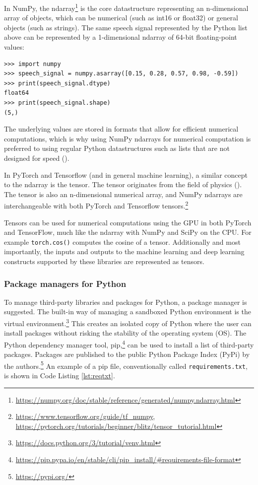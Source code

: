 \documentclass[report.tex]{subfiles}
\begin{document}
In NumPy, the ndarray\footnote{\url{https://numpy.org/doc/stable/reference/generated/numpy.ndarray.html}} is the core datastructure representing an n-dimensional array of objects, which can be numerical (such as int16 or float32) or general objects (such as strings). The same speech signal represented by the Python list above can be represented by a 1-dimensional ndarray of 64-bit floating-point values:

\begin{listing}[!ht]
\centering
\begin{BVerbatim}
>>> import numpy
>>> speech_signal = numpy.asarray([0.15, 0.28, 0.57, 0.98, -0.59])
>>> print(speech_signal.dtype)
float64
>>> print(speech_signal.shape)
(5,)
\end{BVerbatim}
\end{listing}

The underlying values are stored in formats that allow for efficient numerical computations, which is why using NumPy ndarrays for numerical computation is preferred to using regular Python datastructures such as lists that are not designed for speed (\cite{ndarrayfast}).

In PyTorch and Tensorflow (and in general machine learning), a similar concept to the ndarray is the tensor. The tensor originates from the field of physics (\cite{whatistensor}). The tensor is also an n-dimensional numerical array, and NumPy ndarrays are interchangeable with both PyTorch and Tensorflow tensors.\footnote{\url{https://www.tensorflow.org/guide/tf_numpy}, \url{https://pytorch.org/tutorials/beginner/blitz/tensor_tutorial.html}}

Tensors can be used for numerical computations using the GPU in both PyTorch and TensorFlow, much like the ndarray with NumPy and SciPy on the CPU. For example \Verb#torch.cos()# computes the cosine of a tensor. Additionally and most importantly, the inputs and outputs to the machine learning and deep learning constructs supported by these libraries are represented as tensors.

\subsubsection{Package managers for Python}

To manage third-party libraries and packages for Python, a package manager is suggested. The built-in way of managing a sandboxed Python environment is the virtual environment.\footnote{\url{https://docs.python.org/3/tutorial/venv.html}} This creates an isolated copy of Python where the user can install packages without risking the stability of the operating system (OS). The Python dependency manager tool, pip,\footnote{\url{https://pip.pypa.io/en/stable/cli/pip_install/\#requirements-file-format}} can be used to install a list of third-party packages. Packages are published to the public Python Package Index (PyPi) by the authors.\footnote{\url{https://pypi.org/}} An example of a pip file, conventionally called \Verb#requirements.txt#, is shown in Code Listing \ref{lst:reqtxt}.
\end{document}
